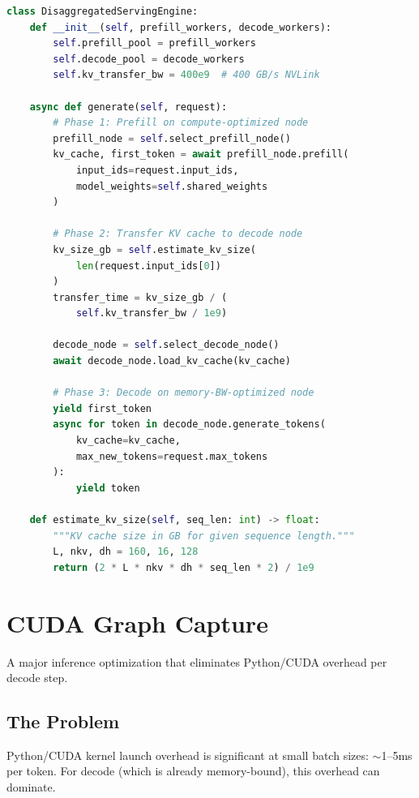 \documentclass[11pt,a4paper]{article}
\begin{document}
\begin{lstlisting}[language=Python, caption={Disaggregated Serving Engine}]
class DisaggregatedServingEngine:
    def __init__(self, prefill_workers, decode_workers):
        self.prefill_pool = prefill_workers
        self.decode_pool = decode_workers
        self.kv_transfer_bw = 400e9  # 400 GB/s NVLink
    
    async def generate(self, request):
        # Phase 1: Prefill on compute-optimized node
        prefill_node = self.select_prefill_node()
        kv_cache, first_token = await prefill_node.prefill(
            input_ids=request.input_ids,
            model_weights=self.shared_weights
        )
        
        # Phase 2: Transfer KV cache to decode node
        kv_size_gb = self.estimate_kv_size(
            len(request.input_ids[0])
        )
        transfer_time = kv_size_gb / (
            self.kv_transfer_bw / 1e9)
        
        decode_node = self.select_decode_node()
        await decode_node.load_kv_cache(kv_cache)
        
        # Phase 3: Decode on memory-BW-optimized node
        yield first_token
        async for token in decode_node.generate_tokens(
            kv_cache=kv_cache,
            max_new_tokens=request.max_tokens
        ):
            yield token
    
    def estimate_kv_size(self, seq_len: int) -> float:
        """KV cache size in GB for given sequence length."""
        L, nkv, dh = 160, 16, 128
        return (2 * L * nkv * dh * seq_len * 2) / 1e9
\end{lstlisting}

\section{CUDA Graph Capture}

A major inference optimization that eliminates Python/CUDA overhead per decode step.

\subsection{The Problem}

Python/CUDA kernel launch overhead is significant at small batch sizes: $\sim$1--5ms per token. For decode (which is already memory-bound), this overhead can dominate.
\end{document}

